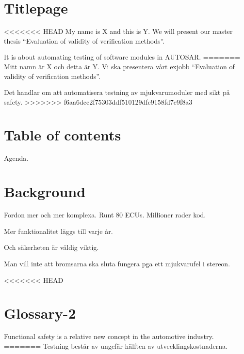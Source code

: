 \documentclass[a4paper]{article}
\begin{document}
\section{Titlepage}
<<<<<<< HEAD
My name is X and this is Y. We will present our master
thesis ``Evaluation of validity of verification methods''.

It is about automating testing of software modules in AUTOSAR.
=======
Mitt namn är X och detta är Y. Vi ska presentera vårt exjobb
``Evaluation of validity of verification methods''.

Det handlar om att automatisera testning av mjukvarumoduler med sikt
på safety.
>>>>>>> f6aa6dcc2f75303ddf510129dfc9158fd7e9f8a3

\section{Table of contents}
Agenda.

\section{Background}
Fordon mer och mer komplexa. Runt 80 ECUs. Millioner rader kod.


Mer funktionalitet läggs till varje år.

Och säkerheten är väldig viktig.

Man vill inte att bromsarna ska sluta fungera pga ett mjukvarufel i stereon.

<<<<<<< HEAD
\section{Glossary-2}
Functional safety is a relative new concept in the automotive
industry.
=======
Testning består av ungefär hälften av utvecklingskostnaderna.
\end{document}
